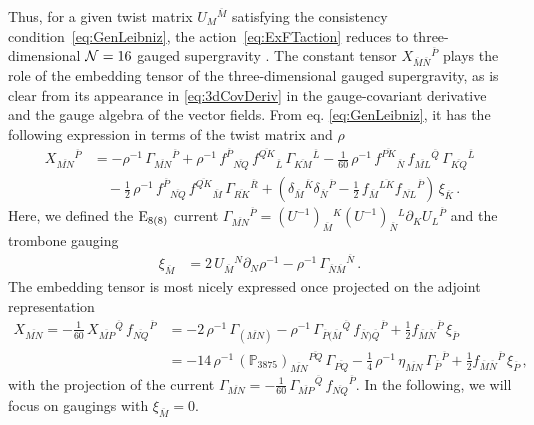 \documentclass[a4paper, 11pt]{article}
\numberwithin{equation}{section}
\newcommand{\ov}[1]{\overline{#1}}
\newcommand{\+}{\oplus}
\newcommand{\UI}{\left(U^{-1}\right)}
\newcommand{\fl}[1]{\ov{#1}}
\begin{document}
Thus, for a given twist matrix $U_{M}{}^{\fl{M}}$ satisfying the consistency condition~\eqref{eq:GenLeibniz}, the action~\eqref{eq:ExFTaction} reduces to three-dimensional ${\cal N}=16$ gauged supergravity \cite{Nicolai:2000sc,Nicolai:2001sv}. The constant tensor $X_{\fl{M}\fl{N}}{}^{\fl{P}}$ plays the role of the embedding tensor of the three-dimensional gauged supergravity, as is clear from its appearance in \eqref{eq:3dCovDeriv} in the gauge-covariant derivative and the gauge algebra of the vector fields. From eq. \eqref{eq:GenLeibniz}, it has the following expression in terms of the twist matrix and $\rho$
\begin{equation}
	\begin{split}
		X_{\fl{MN}}{}^{\fl{P}}&=-\rho^{-1}\,\Gamma_{\fl{MN}}{}^{\fl{P}} + \rho^{-1}\,f^{\fl{P}}{}_{\fl{NQ}}\,f^{\fl{QK}}{}_{\fl{L}}\,\Gamma_{\fl{KM}}{}^{\fl{L}}-\frac{1}{60}\,\rho^{-1}\,f^{\fl{PK}}{}_{\fl{N}}\,f_{\fl{ML}}{}^{\fl{Q}}\,\Gamma_{\fl{KQ}}{}^{\fl{L}}\\
		&\quad-\frac{1}{2}\,\rho^{-1}\,f^{\fl{P}}{}_{\fl{NQ}}\,f^{\fl{QK}}{}_{\fl{M}}\,\Gamma_{\fl{RK}}{}^{\fl{R}}+\left(\delta_{\fl{M}}{}^{\fl{K}}\delta_{\fl{N}}{}^{\fl{P}}-\frac{1}{2}\,f_{\fl{M}}{}^{\fl{LK}}f_{\fl{NL}}{}^{\fl{P}}\right)\,\xi_{\fl{K}}\,.
	\end{split}
\end{equation}
Here, we defined the ${\rm E}_{8(8)}$ current $\Gamma_{\fl{MN}}{}^{\fl{P}}=\UI_{\fl{M}}{}^{K}\UI_{\fl{N}}{}^{L}\partial_{K}U_{L}{}^{\fl{P}}$ and the trombone gauging
\begin{equation} \label{eq:Trombone}
	\begin{split}
		\xi_{\fl{M}} %
		&= 2\,U_{\fl{M}}{}^{N}\partial_{N}\rho^{-1} - \rho^{-1}\, \Gamma_{\ov{N}\ov{M}}{}^{\ov{N}} \,.
	\end{split}
\end{equation}
The embedding tensor is most nicely expressed once projected on the adjoint representation
\begin{equation} \label{eq:symembeddingtensor}
	\begin{split}
		X_{\fl{MN}} = -\frac{1}{60}\,X_{\fl{MP}}{}^{\fl{Q}}\,f_{\fl{NQ}}{}^{\fl{P}} &= - 2\,\rho^{-1}\,\Gamma_{(\fl{MN})} - \rho^{-1}\,\Gamma_{\fl{P}(\fl{M}}{}^{\fl{Q}}\,f_{\fl{N})\fl{Q}}{}^{\fl{P}} + \frac12 f_{\ov{M}\ov{N}}{}^{\ov{P}}\, \xi_{\ov{P}} \\
		&= - 14\,\rho^{-1}\,(\mathbb{P}_{3875})_{\fl{MN}}{}^{\fl{PQ}}\,\Gamma_{\fl{PQ}} - \frac{1}{4}\,\rho^{-1}\,\eta_{\fl{MN}}\,\Gamma_{\fl{P}}{}^{\fl{P}} + \frac12 f_{\ov{M}\ov{N}}{}^{\ov{P}}\, \xi_{\ov{P}} \,,
	\end{split}
\end{equation}
with the projection of the current $\Gamma_{\fl{MN}} = - \tfrac{1}{60}\,\Gamma_{\fl{MP}}{}^{\fl{Q}}\,f_{\fl{NQ}}{}^{\fl{P}}$. In the following, we will focus on gaugings with $\xi_{\fl{M}}=0$.
\end{document}
